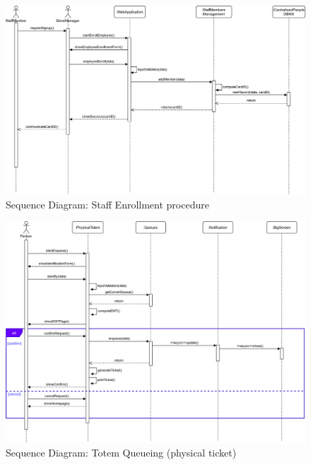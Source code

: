 \begin{figure}[H]
	\includegraphics[width=\linewidth]{../Diagrams/Sequence/sequence_staff_enroll.png}
	\caption{Sequence Diagram: Staff Enrollment procedure}
	\label{fig:sStaffEn}
\end{figure}
\begin{figure}[H]
	\includegraphics[width=\linewidth]{../Diagrams/Sequence/sequence_totem_enqueue.png}
	\caption{Sequence Diagram: Totem Queueing (physical ticket)}
	\label{fig:sTotemEnq}
\end{figure}

